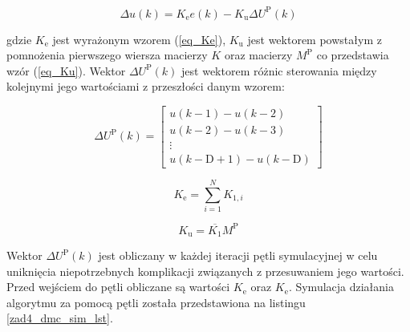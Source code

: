 \begin{equation}
\label{du(k)}
\Delta u(k) = K_{\mathrm{e}} e(k) - K_{\mathrm{u}} \Delta U^{\mathrm{P}}(k)
\end{equation}

gdzie $K_{\mathrm{e}}$ jest wyrażonym wzorem (\ref{eq_Ke}), $K_{\mathrm{u}}$ jest wektorem powstałym z pomnożenia pierwszego wiersza macierzy $K$ oraz macierzy $M^{\mathrm{P}}$ co przedstawia wzór (\ref{eq_Ku}). Wektor $\Delta U^{\mathrm{P}}(k)$ jest wektorem różnic sterowania między kolejnymi jego wartościami z przeszłości danym wzorem:

\begin{equation}
\Delta U^{\mathrm{P}}(k)=\left[
\begin{array}{c}
u(k-1) - u(k-2)\\
u(k-2) - u(k-3)\\
\vdots\\
u(k-\mathrm{D}+1) - u(k-\mathrm{D})
\end{array}
\right]
\end{equation}

\begin{equation}
\label{eq_Ke}
K_{\mathrm{e}} = \sum_{i=1}^{N} K_{1,i}
\end{equation}

\begin{equation}
\label{eq_Ku}
K_{\mathrm{u}} = \overline{K_{1}} M^{\mathrm{P}}
\end{equation}

Wektor $\Delta U^{\mathrm{P}}(k)$ jest obliczany w każdej iteracji pętli symulacyjnej w celu uniknięcia niepotrzebnych komplikacji związanych z przesuwaniem jego wartości. Przed wejściem do pętli obliczane są wartości $K_{\mathrm{e}}$ oraz $K_{\mathrm{e}}$. Symulacja działania algorytmu za pomocą pętli została przedstawiona na listingu \ref{zad4_dmc_sim_lst}.\\

